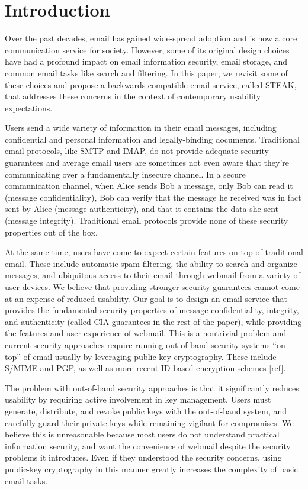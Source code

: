\section{Introduction}

Over the past decades, email has gained wide-spread adoption 
and is now a core communication service for society. However, 
some of its original design choices have had a profound impact 
on email information security, email storage, and common email 
tasks like search and filtering. In this paper, we revisit some 
of these choices and propose a backwards-compatible email service, 
called STEAK, that addresses these concerns in the context of 
contemporary usability expectations.

Users send a wide variety of information in their email messages, 
including confidential and personal information and legally-binding 
documents. Traditional email protocols, like SMTP and IMAP, do not 
provide adequate security guarantees and average email users are 
sometimes not even aware that they're communicating over a fundamentally 
insecure channel. In a secure communication channel, when Alice sends 
Bob a message, only Bob can read it (message confidentiality), Bob can 
verify that the message he received was in fact sent by Alice (message 
authenticity), and that it contains the data she sent (message integrity). 
Traditional email protocols provide none of these security properties 
out of the box. 

At the same time, users have come to expect certain features on top of 
traditional email.  These include automatic spam filtering, the ability 
to search and organize messages, and ubiquitous access to their email 
through webmail from a variety of user devices. We believe that providing 
stronger security guarantees cannot come at an expense of reduced usability. 
Our goal is to design an email service that provides the fundamental 
security properties of message confidentiality, integrity, and authenticity 
(called CIA guarantees in the rest of the paper), while providing the 
features and user experience of webmail.  This is a nontrivial problem 
and current security approaches require running out-of-band security 
systems ``on top'' of email usually by leveraging public-key cryptography. 
These include S/MIME and PGP, as well as more recent ID-based encryption 
schemes [ref].

The problem with out-of-band security approaches is that it significantly 
reduces usability by requiring active involvement in key management. 
Users must generate, distribute, and revoke public keys with the out-of-band 
system, and carefully guard their private keys while remaining vigilant 
for compromises. We believe this is unreasonable because most users do 
not understand practical information security, and want the convenience 
of webmail despite the security problems it introduces. Even if they 
understood the security concerns, using public-key cryptography in this 
manner greatly increases the complexity of basic email tasks. 

